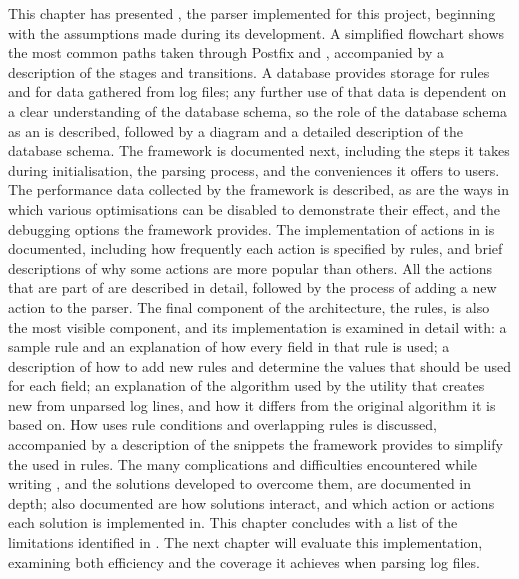 This chapter has presented \parsername{}, the parser implemented for this
project, beginning with the assumptions made during its development.  A
simplified flowchart shows the most common paths taken through Postfix and
\parsername{}, accompanied by a description of the stages and transitions.
A database provides storage for rules and for data gathered from log files;
any further use of that data is dependent on a clear understanding of the
database schema, so the role of the database schema as an  is
described, followed by a diagram and a detailed description of the database
schema.  The framework is documented next, including the steps it takes
during initialisation, the parsing process, and the conveniences it offers
to users.  The performance data collected by the framework is described, as
are the ways in which various optimisations can be disabled to demonstrate
their effect, and the debugging options the framework provides.  The
implementation of actions in \parsername{} is documented, including how
frequently each action is specified by rules, and brief descriptions of why
some actions are more popular than others.  All the actions that are part
of \parsername{} are described in detail, followed by the process of adding
a new action to the parser.  The final component of the architecture, the
rules, is also the most visible component, and its implementation is
examined in detail with: a sample rule and an explanation of how every
field in that rule is used; a description of how to add new rules and
determine the values that should be used for each field; an explanation of
the algorithm used by the utility that creates new \regexes{} from unparsed
log lines, and how it differs from the original algorithm it is based on.
How \parsername{} uses rule conditions and overlapping rules is discussed,
accompanied by a description of the  snippets the framework
provides to simplify the \regexes{} used in rules.  The many complications
and difficulties encountered while writing \parsername{}, and the solutions
developed to overcome them, are documented in depth; also documented are
how solutions interact, and which action or actions each solution is
implemented in.  This chapter concludes with a list of the limitations
identified in \parsername{}.  The next chapter will evaluate this
implementation, examining both \parsernames{} efficiency and the coverage
it achieves when parsing log files.
